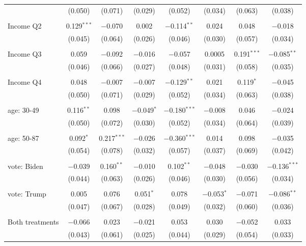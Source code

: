 \begin{tabular}{@{\extracolsep{5pt}}lccccccc}
  & (0.050) & (0.071) & (0.029) & (0.052) & (0.034) & (0.063) & (0.038) \\ 
  & & & & & & & \\ 
 Income Q2 & 0.129$^{***}$ & $-$0.070 & 0.002 & $-$0.114$^{**}$ & 0.024 & 0.048 & $-$0.018 \\ 
  & (0.045) & (0.064) & (0.026) & (0.046) & (0.030) & (0.057) & (0.034) \\ 
  & & & & & & & \\ 
 Income Q3 & 0.059 & $-$0.092 & $-$0.016 & $-$0.057 & 0.0005 & 0.191$^{***}$ & $-$0.085$^{**}$ \\ 
  & (0.046) & (0.066) & (0.027) & (0.048) & (0.031) & (0.058) & (0.035) \\ 
  & & & & & & & \\ 
 Income Q4 & 0.048 & $-$0.007 & $-$0.007 & $-$0.129$^{**}$ & 0.021 & 0.119$^{*}$ & $-$0.045 \\ 
  & (0.050) & (0.071) & (0.029) & (0.052) & (0.034) & (0.063) & (0.038) \\ 
  & & & & & & & \\ 
 age: 30-49 & 0.116$^{**}$ & 0.098 & $-$0.049$^{*}$ & $-$0.180$^{***}$ & $-$0.008 & 0.046 & $-$0.024 \\ 
  & (0.050) & (0.072) & (0.030) & (0.052) & (0.034) & (0.064) & (0.039) \\ 
  & & & & & & & \\ 
 age: 50-87 & 0.092$^{*}$ & 0.217$^{***}$ & $-$0.026 & $-$0.360$^{***}$ & 0.014 & 0.098 & $-$0.035 \\ 
  & (0.054) & (0.078) & (0.032) & (0.057) & (0.037) & (0.069) & (0.042) \\ 
  & & & & & & & \\ 
 vote: Biden & $-$0.039 & 0.160$^{**}$ & $-$0.010 & 0.102$^{**}$ & $-$0.048 & $-$0.030 & $-$0.136$^{***}$ \\ 
  & (0.044) & (0.063) & (0.026) & (0.046) & (0.030) & (0.056) & (0.034) \\ 
  & & & & & & & \\ 
 vote: Trump & 0.005 & 0.076 & 0.051$^{*}$ & 0.078 & $-$0.053$^{*}$ & $-$0.071 & $-$0.086$^{**}$ \\ 
  & (0.047) & (0.067) & (0.028) & (0.049) & (0.032) & (0.060) & (0.036) \\ 
  & & & & & & & \\ 
 Both treatments & $-$0.066 & 0.023 & $-$0.021 & 0.053 & 0.030 & $-$0.052 & 0.033 \\ 
  & (0.043) & (0.061) & (0.025) & (0.044) & (0.029) & (0.054) & (0.033) \\ 

\end{tabular}
